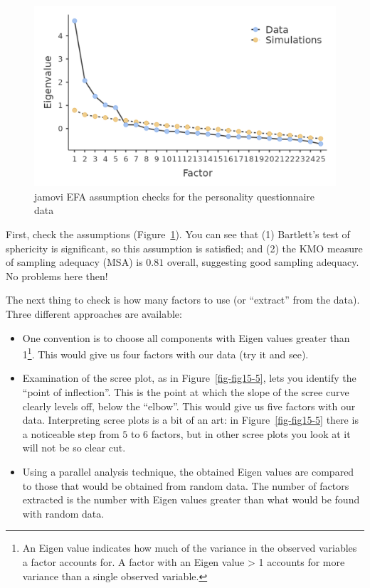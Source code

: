 \documentclass[
  a4paper,
]{book}
\providecommand{\tightlist}{%
  \setlength{\itemsep}{0pt}\setlength{\parskip}{0pt}}\usepackage{longtable,booktabs,array}
\begin{document}
\begin{figure}

\includegraphics[width=1\textwidth,height=\textheight]{images/fig15-4.png} \hfill{}

\caption{\label{fig-fig15-4}jamovi EFA assumption checks for the
personality questionnaire data}

\end{figure}

First, check the assumptions (Figure~\ref{fig-fig15-4}). You can see
that (1) Bartlett's test of sphericity is significant, so this
assumption is satisfied; and (2) the KMO measure of sampling adequacy
(MSA) is \(0.81\) overall, suggesting good sampling adequacy. No
problems here then!

The next thing to check is how many factors to use (or ``extract'' from
the data). Three different approaches are available:

\begin{itemize}
\tightlist
\item
  One convention is to choose all components with Eigen values greater
  than 1\footnote{An Eigen value indicates how much of the variance in
    the observed variables a factor accounts for. A factor with an Eigen
    value \textgreater{} 1 accounts for more variance than a single
    observed variable.}. This would give us four factors with our data
  (try it and see).
\end{itemize}

\begin{itemize}
\item
  Examination of the scree plot, as in Figure~\ref{fig-fig15-5}, lets
  you identify the ``point of inflection''. This is the point at which
  the slope of the scree curve clearly levels off, below the ``elbow''.
  This would give us five factors with our data. Interpreting scree
  plots is a bit of an art: in Figure~\ref{fig-fig15-5} there is a
  noticeable step from \(5\) to \(6\) factors, but in other scree plots
  you look at it will not be so clear cut.
\item
  Using a parallel analysis technique, the obtained Eigen values are
  compared to those that would be obtained from random data. The number
  of factors extracted is the number with Eigen values greater than what
  would be found with random data.
\end{itemize}
\end{document}
